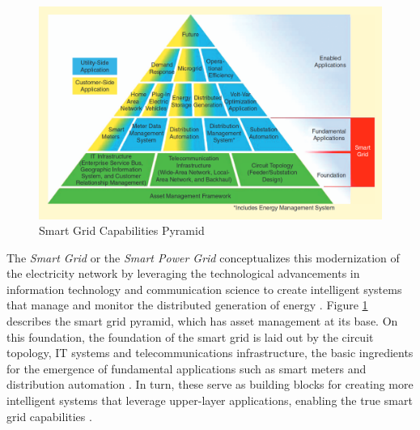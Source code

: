 \begin{figure}[ht]
	\centering
	\includegraphics[width=0.74\linewidth]{./figures/smart_grid.png}
	\caption{Smart Grid Capabilities Pyramid \cite{farhangiPathSmartGrid2010}}
	\label{fig:smart-grid}
\end{figure}


The \textit{Smart Grid} or the \textit{Smart Power Grid} conceptualizes this modernization of the electricity network by leveraging the technological advancements in information technology and communication science to create intelligent systems that manage and monitor the distributed generation of energy \cite{bayindirSmartGridTechnologies2016, farhangiPathSmartGrid2010}. Figure \ref{fig:smart-grid} describes the smart grid pyramid, which has asset management at its base. On this foundation, the foundation of the smart grid is laid out by the circuit topology, \acs{IT} systems and telecommunications infrastructure, the basic ingredients for the emergence of fundamental applications such as smart meters and distribution automation \cite{farhangiPathSmartGrid2010}. In turn, these serve as building blocks for creating more intelligent systems that leverage upper-layer applications, enabling the true smart grid capabilities \cite{farhangiPathSmartGrid2010}.
